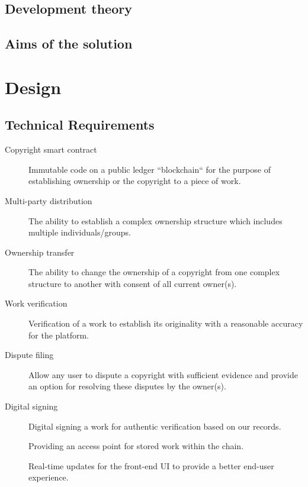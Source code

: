 \documentclass[12pt]{article}
\begin{document}
\subsection{Development theory}

\subsection{Aims of the solution}

\section{Design}

\subsection{Technical Requirements}

\begin{description}
	\item[Copyright smart contract] Immutable code on a public ledger “blockchain“ for the purpose of establishing ownership or the copyright to a piece of work.
	\item[Multi-party distribution] The ability to establish a complex ownership structure which includes multiple individuals/groups.
	\item[Ownership transfer] The ability to change the ownership of a copyright from one complex structure to another with consent of all current owner(s).
	\item[Work verification] Verification of a work to establish its originality with a reasonable accuracy for the platform.
	\item[Dispute filing] Allow any user to dispute a copyright with sufficient evidence and provide an option for resolving these disputes by the owner(s).
	\item[Digital signing] Digital signing a work for authentic verification based on our records.
	\item[\color{orange}{Decentralised Work CDN & proxy}] Providing an access point for stored work within the chain.
	\item[\color{orange}{Web-socket updates}] Real-time updates for the front-end UI to provide a better end-user experience.
\end{description}
\end{document}
